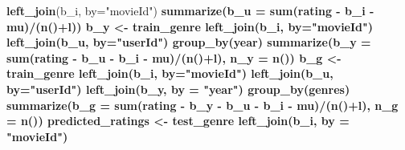 \documentclass[]{article}
\newenvironment{Shaded}{\begin{snugshade}}{\end{snugshade}}
\newcommand{\DataTypeTok}[1]{\textcolor[rgb]{0.13,0.29,0.53}{#1}}
\newcommand{\KeywordTok}[1]{\textcolor[rgb]{0.13,0.29,0.53}{\textbf{#1}}}
\newcommand{\NormalTok}[1]{#1}
\newcommand{\OperatorTok}[1]{\textcolor[rgb]{0.81,0.36,0.00}{\textbf{#1}}}
\newcommand{\StringTok}[1]{\textcolor[rgb]{0.31,0.60,0.02}{#1}}
\begin{document}
\begin{Shaded}
\begin{Highlighting}[]
{{{{{{{{{{\StringTok{    }\KeywordTok{left_join}\NormalTok{(b_i, }\DataTypeTok{by=}\StringTok{"movieId"}\NormalTok{) }\OperatorTok{%>%}\StringTok{ }\KeywordTok{group_by}\NormalTok{(userId) }\OperatorTok{%>%}
\StringTok{    }\KeywordTok{summarize}\NormalTok{(}\DataTypeTok{b_u =} \KeywordTok{sum}\NormalTok{(rating }\OperatorTok{-}\StringTok{ }\NormalTok{b_i }\OperatorTok{-}\StringTok{ }\NormalTok{mu)}\OperatorTok{/}\NormalTok{(}\KeywordTok{n}\NormalTok{()}\OperatorTok{+}\NormalTok{l))}
\NormalTok{  b_y <-}\StringTok{ }\NormalTok{train_genre }\OperatorTok{%>%}
\StringTok{    }\KeywordTok{left_join}\NormalTok{(b_i, }\DataTypeTok{by=}\StringTok{"movieId"}\NormalTok{) }\OperatorTok{%>%}
\StringTok{    }\KeywordTok{left_join}\NormalTok{(b_u, }\DataTypeTok{by=}\StringTok{"userId"}\NormalTok{) }\OperatorTok{%>%}
\StringTok{    }\KeywordTok{group_by}\NormalTok{(year) }\OperatorTok{%>%}
\StringTok{    }\KeywordTok{summarize}\NormalTok{(}\DataTypeTok{b_y =} \KeywordTok{sum}\NormalTok{(rating }\OperatorTok{-}\StringTok{ }\NormalTok{b_u }\OperatorTok{-}\StringTok{ }\NormalTok{b_i }\OperatorTok{-}\StringTok{ }\NormalTok{mu)}\OperatorTok{/}\NormalTok{(}\KeywordTok{n}\NormalTok{()}\OperatorTok{+}\NormalTok{l), }\DataTypeTok{n_y =} \KeywordTok{n}\NormalTok{())}
\NormalTok{  b_g <-}\StringTok{ }\NormalTok{train_genre }\OperatorTok{%>%}
\StringTok{    }\KeywordTok{left_join}\NormalTok{(b_i, }\DataTypeTok{by=}\StringTok{"movieId"}\NormalTok{) }\OperatorTok{%>%}
\StringTok{    }\KeywordTok{left_join}\NormalTok{(b_u, }\DataTypeTok{by=}\StringTok{"userId"}\NormalTok{) }\OperatorTok{%>%}
\StringTok{    }\KeywordTok{left_join}\NormalTok{(b_y, }\DataTypeTok{by =} \StringTok{"year"}\NormalTok{) }\OperatorTok{%>%}
\StringTok{    }\KeywordTok{group_by}\NormalTok{(genres) }\OperatorTok{%>%}
\StringTok{    }\KeywordTok{summarize}\NormalTok{(}\DataTypeTok{b_g =} \KeywordTok{sum}\NormalTok{(rating }\OperatorTok{-}\StringTok{ }\NormalTok{b_y }\OperatorTok{-}\StringTok{ }\NormalTok{b_u }\OperatorTok{-}\StringTok{ }\NormalTok{b_i }\OperatorTok{-}\StringTok{ }\NormalTok{mu)}\OperatorTok{/}\NormalTok{(}\KeywordTok{n}\NormalTok{()}\OperatorTok{+}\NormalTok{l), }\DataTypeTok{n_g =} \KeywordTok{n}\NormalTok{())}
\NormalTok{  predicted_ratings <-}
\StringTok{    }\NormalTok{test_genre }\OperatorTok{%>%}
\StringTok{    }\KeywordTok{left_join}\NormalTok{(b_i, }\DataTypeTok{by =} \StringTok{"movieId"}\NormalTok{) }\OperatorTok{%>%}\StringTok{ }\KeywordTok{left_join}\NormalTok{(b_u, }\DataTypeTok{by =} \StringTok{"userId"}\NormalTok{) }\OperatorTok{%>%}\StringTok{ }\KeywordTok{left_join}\NormalTok{(b_y, }\DataTypeTok{by =} \StringTok{"year"}\NormalTok{) }\OperatorTok{%>%}\StringTok{ }\KeywordTok{left_join}\NormalTok{(b_g, }\DataTypeTok{by =} \StringTok{"genres"}\NormalTok{) }\OperatorTok{%>%}\StringTok{ }\KeywordTok{mutate}\NormalTok{(}\DataTypeTok{pred =}\NormalTok{ mu }\OperatorTok{+}\StringTok{ }\NormalTok{b_i }\OperatorTok{+}\StringTok{ }\NormalTok{b_u }\OperatorTok{+}\StringTok{ }\NormalTok{b_y }\OperatorTok{+}\StringTok{ }\NormalTok{b_g) }\OperatorTok{%>%}\StringTok{ }\KeywordTok{pull}\NormalTok{(pred)}
}}}}}}}}}}}}}}}}}}}}}}
\end{Highlighting}
\end{Shaded}
\end{document}
